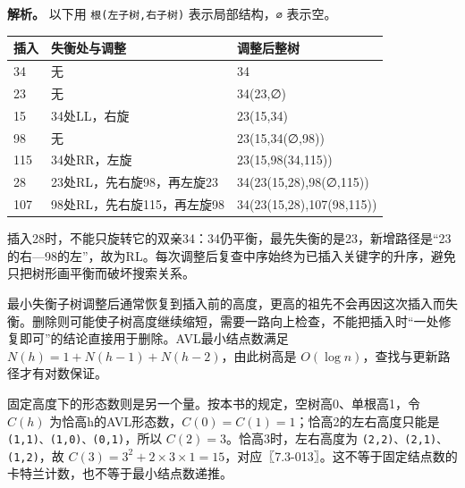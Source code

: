 \textbf{解析。} 以下用 \texttt{根(\allowbreak{}左子树,\allowbreak{}右子树)\allowbreak{}} 表示局部结构，\texttt{∅} 表示空。

\begin{wideblock}

\par\medskip\noindent\begin{minipage}{\linewidth}\fontsize{9.3}{12}\selectfont\begin{tabularx}{\linewidth}{@{}YYY@{}}
\toprule\noalign{}
插入 & 失衡处与调整 & 调整后整树 \\
\midrule\noalign{}


34 & 无 & 34 \\
23 & 无 & 34(23,∅) \\
15 & 34处LL，右旋 & 23(15,34) \\
98 & 无 & 23(15,34(∅,98)) \\
115 & 34处RR，左旋 & 23(15,98(34,115)) \\
28 & 23处RL，先右旋98，再左旋23 & 34(23(15,28),98(∅,115)) \\
107 & 98处RL，先右旋115，再左旋98 & 34(23(15,28),107(98,115)) \\
\bottomrule\end{tabularx}
\end{minipage}\par\medskip

\end{wideblock}

插入28时，不能只旋转它的双亲34：34仍平衡，最先失衡的是23，新增路径是``23的右---98的左''，故为RL。每次调整后复查中序始终为已插入关键字的升序，避免只把树形画平衡而破坏搜索关系。

最小失衡子树调整后通常恢复到插入前的高度，更高的祖先不会再因这次插入而失衡。删除则可能使子树高度继续缩短，需要一路向上检查，不能把插入时``一处修复即可''的结论直接用于删除。AVL最小结点数满足 \(N(h)=1+N(h-1)+N(h-2)\)，由此树高是 \(O(\log n)\)，查找与更新路径才有对数保证。

固定高度下的形态数则是另一个量。按本书的规定，空树高0、单根高1，令 \(C(h)\) 为恰高h的AVL形态数，\(C(0)=C(1)=1\)；恰高2的左右高度只能是 \texttt{(\allowbreak{}1,\allowbreak{}1)\allowbreak{}、(\allowbreak{}1,\allowbreak{}0)\allowbreak{}、(\allowbreak{}0,\allowbreak{}1)\allowbreak{}}，所以 \(C(2)=3\)。恰高3时，左右高度为 \texttt{(\allowbreak{}2,\allowbreak{}2)\allowbreak{}、(\allowbreak{}2,\allowbreak{}1)\allowbreak{}、(\allowbreak{}1,\allowbreak{}2)\allowbreak{}}，故 \(C(3)=3^2+2\times3\times1=15\)，对应〖7.3-013〗。这不等于固定结点数的卡特兰计数，也不等于最小结点数递推。

